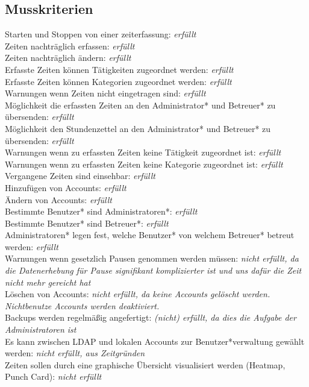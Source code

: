 \begin{frame}
	\subsection{Musskriterien}
	\begin{tabular}[l]
		Starten und Stoppen von einer zeiterfassung: \emph{erfüllt} \\
		Zeiten nachträglich erfassen: \emph{erfüllt} \\
		Zeiten nachträglich ändern: \emph{erfüllt} \\
		Erfasste Zeiten können Tätigkeiten zugeordnet werden: \emph{erfüllt} \\
		Erfasste Zeiten können Kategorien zugeordnet werden: \emph{erfüllt} \\
		Warnungen wenn Zeiten nicht eingetragen sind: \emph{erfüllt} \\
		Möglichkeit die erfassten Zeiten an den Administrator* und Betreuer* zu übersenden: \emph{erfüllt} \\
		Möglichkeit den Stundenzettel an den Administrator* und Betreuer* zu übersenden: \emph{erfüllt} \\
		Warnungen wenn zu erfassten Zeiten keine Tätigkeit zugeordnet ist: \emph{erfüllt} \\
		Warnungen wenn zu erfassten Zeiten keine Kategorie zugeordnet ist: \emph{erfüllt} \\
		Vergangene Zeiten sind einsehbar: \emph{erfüllt} \\
		Hinzufügen von Accounts: \emph{erfüllt} \\
		Ändern von Accounts: \emph{erfüllt} \\
		Bestimmte Benutzer* sind Administratoren*: \emph{erfüllt} \\
		Bestimmte Benutzer* sind Betreuer*: \emph{erfüllt} \\
		Administratoren* legen fest, welche Benutzer* von welchem Betreuer* betreut werden: \emph{erfüllt} \\
		 Warnungen wenn gesetzlich Pausen genommen werden müssen: \emph{nicht erfüllt, da die Datenerhebung für Pause signifikant komplizierter ist und uns dafür die Zeit nicht mehr gereicht hat} \\
		 Löschen von Accounts: \emph{nicht erfüllt, da keine Accounts gelöscht werden. Nichtbenutze Accounts werden deaktiviert.} \\
		 Backups werden regelmäßig angefertigt: \emph{(nicht) erfüllt, da dies die Aufgabe der Administratoren ist} \\
		 Es kann zwischen LDAP und lokalen Accounts zur Benutzer*verwaltung gewählt werden: \emph{nicht erfüllt, aus Zeitgründen} \\
		 Zeiten sollen durch eine graphische Übersicht visualisiert werden (Heatmap, Punch Card): \emph{nicht erfüllt} \\
	\end{tabular}
\end{frame}

